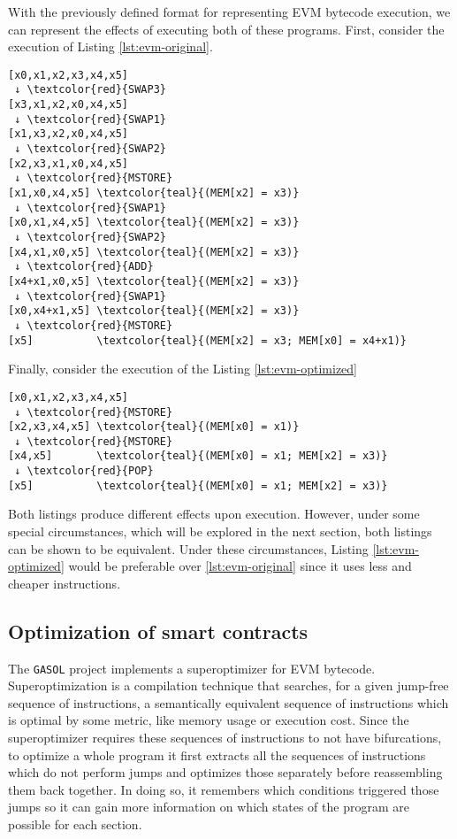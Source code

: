 With the previously defined format for representing EVM bytecode 
execution, we can represent the effects of executing both of these
programs. First, consider the execution of Listing \ref{lst:evm-original}.

\begin{Verbatim}[commandchars=\\\{\}]
[x0,x1,x2,x3,x4,x5]
 ↓ \textcolor{red}{SWAP3}
[x3,x1,x2,x0,x4,x5]
 ↓ \textcolor{red}{SWAP1}
[x1,x3,x2,x0,x4,x5]
 ↓ \textcolor{red}{SWAP2}
[x2,x3,x1,x0,x4,x5]
 ↓ \textcolor{red}{MSTORE}
[x1,x0,x4,x5] \textcolor{teal}{(MEM[x2] = x3)}
 ↓ \textcolor{red}{SWAP1}
[x0,x1,x4,x5] \textcolor{teal}{(MEM[x2] = x3)}
 ↓ \textcolor{red}{SWAP2}
[x4,x1,x0,x5] \textcolor{teal}{(MEM[x2] = x3)}
 ↓ \textcolor{red}{ADD}
[x4+x1,x0,x5] \textcolor{teal}{(MEM[x2] = x3)}
 ↓ \textcolor{red}{SWAP1}
[x0,x4+x1,x5] \textcolor{teal}{(MEM[x2] = x3)}
 ↓ \textcolor{red}{MSTORE}
[x5]          \textcolor{teal}{(MEM[x2] = x3; MEM[x0] = x4+x1)}
\end{Verbatim}

Finally, consider the execution of the Listing \ref{lst:evm-optimized}

\begin{Verbatim}[commandchars=\\\{\}]
[x0,x1,x2,x3,x4,x5]
 ↓ \textcolor{red}{MSTORE}
[x2,x3,x4,x5] \textcolor{teal}{(MEM[x0] = x1)}
 ↓ \textcolor{red}{MSTORE}
[x4,x5]       \textcolor{teal}{(MEM[x0] = x1; MEM[x2] = x3)}
 ↓ \textcolor{red}{POP}
[x5]          \textcolor{teal}{(MEM[x0] = x1; MEM[x2] = x3)}
\end{Verbatim}

Both listings produce different effects upon execution. However, under
some special circumstances, which will be explored in the next section,
both listings can be shown to be equivalent. Under these circumstances,
Listing \ref{lst:evm-optimized} would be preferable over \ref{lst:evm-original}
since it uses less and cheaper instructions.

\subsection{Optimization of smart contracts}
\label{sect:optimization-smart-contracts}

The \verb|GASOL| project implements a superoptimizer for EVM bytecode. Superoptimization 
is a compilation technique that searches, for a given jump-free sequence of 
instructions, a semantically equivalent sequence of instructions which is optimal
by some metric, like memory usage or execution cost. Since the superoptimizer 
requires these sequences of instructions to not have bifurcations, to optimize a
whole program it first extracts all the sequences of instructions which do not perform
jumps and optimizes those separately before reassembling them back together. 
In doing so, it remembers which conditions triggered those jumps so it can gain more
information on which states of the program are possible for each section.

